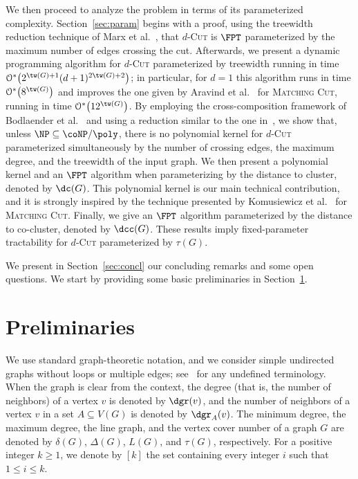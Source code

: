 \documentclass[a4paper,UKenglish,cleveref, autoref]{lipics-v2019}
\newcommand{\bigOs}[1]{\mathcal{O}^*\!\left(#1\right)}
\newcommand{\pname}[1]{\textsc{#1}}
\begin{document}
We then proceed to analyze the problem in terms of its parameterized complexity.
Section~\ref{sec:param} begins with a proof, using the treewidth reduction technique of Marx et al.~\cite{marx_treewidth_reduction}, that \pname{$d$-Cut} is $\FPT$ parameterized by the maximum number of edges crossing the cut.
Afterwards, we present a dynamic programming algorithm for \pname{$d$-Cut} parameterized by treewidth running in time $\bigOs{2^{\tw(G)+1}(d+1)^{2\tw(G) + 2}}$; in particular, for $d=1$ this algorithm runs in time $\bigOs{8^{\tw(G)}}$ and improves the one given by Aravind et al.~\cite{matching_cut_structural} for \pname{Matching Cut}, running in time  $\bigOs{12^{\tw(G)}}$.
By employing the cross-composition framework of Bodlaender et al.~\cite{cross_composition} and using a reduction similar to the one in~\cite{matching_cut_ipec}, we show that, unless $\NP \subseteq \coNP/\poly$, there is no polynomial kernel for \pname{$d$-Cut} parameterized simultaneously by the number of crossing edges, the maximum degree, and the treewidth of the input graph.
We then present a polynomial kernel and an $\FPT$ algorithm when parameterizing by the distance to cluster, denoted by $\dc(G)$. This polynomial kernel is our main technical contribution, and it is strongly inspired by the technique presented by  Komusiewicz et al.~\cite{matching_cut_ipec} for \textsc{Matching Cut}. Finally, we give an $\FPT$ algorithm parameterized by the distance to co-cluster, denoted by $\dcc(G)$.
These results imply fixed-parameter tractability for \pname{$d$-Cut} parameterized by $\tau(G)$.

We present in Section~\ref{sec:concl} our concluding remarks and some open questions. We start by providing some basic preliminaries in Section~\ref{sec:prelim}.


\section{Preliminaries}\label{sec:prelim}

We use standard graph-theoretic notation, and we consider simple undirected graphs without loops or multiple edges; see~\cite{Die10} for any undefined terminology. When the graph is clear from the context, the degree (that is, the number of neighbors) of a vertex $v$ is denoted by  $\dgr(v)$, and the number of neighbors of a vertex $v$ in a set $A \subseteq V(G)$ is denoted by $\dgr_A(v)$. The minimum degree, the maximum degree, the line graph, and the vertex cover number of a graph $G$ are denoted by $\delta(G)$, $\Delta(G)$, $L(G)$,
and $\tau(G)$, respectively. For a positive integer $k \geq 1$, we denote by $[k]$ the set containing every integer $i$ such that $1 \leq i \leq k$.
\end{document}
